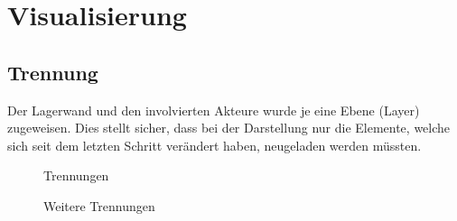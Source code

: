 \section{Visualisierung}

\subsection{Trennung}
Der Lagerwand und den involvierten Akteure wurde je eine Ebene (Layer) zugeweisen. Dies stellt sicher, dass bei der Darstellung nur die Elemente, welche sich seit dem letzten Schritt verändert haben, neugeladen werden müssten.  

%
\begin{figure}
\hfill
{}\hfill
{}
\caption{Trennungen}
\end{figure}

\begin{figure}
\hfill
{}
\caption{Weitere Trennungen}
\end{figure}
%

